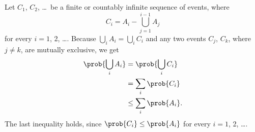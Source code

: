 Let $C_1$, $C_2$, \dots\ be a finite or countably infinite sequence of events, where
\[
    C_i = A_i-\bigcup_{j=1}^{i-1}A_j
\]
for every $i=1$, 2, \dots.
Because $\bigcup_iA_i=\bigcup_iC_i$ and any two events $C_j$, $C_k$, where $j\ne k$, are mutually exclusive, we get
\begin{align*}
    \prob{\bigcup_iA_i} &= \prob{\bigcup_iC_i} \\
    &= \sum_i\prob{C_i} \\
    &\le \sum_i\prob{A_i}.
\end{align*}
The last inequality holds, since $\prob{C_i}\le\prob{A_i}$ for every $i=1$, 2, \dots.
